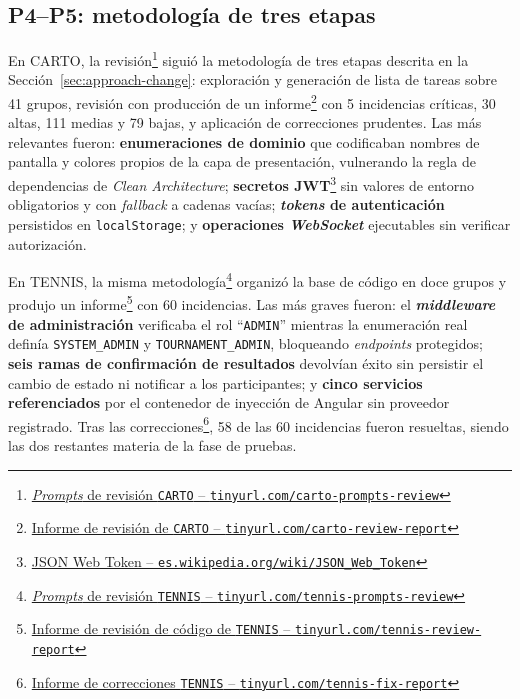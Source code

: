 \subsection{P4--P5: metodología de tres etapas}

En \ac{CARTO}, la revisión\footnote{\href{https://github.com/alu0101549491/TFG-Fabian-Gonzalez-Lence/tree/main/resources/prompts/4-CartographicProjectManager/4-RevisionDelCodigo}{\textit{Prompts} de revisión \texttt{CARTO} -- \texttt{tinyurl.com/carto-prompts-review}}} siguió la metodología de tres etapas descrita en la Sección~\ref{sec:approach-change}: exploración y generación de lista de tareas sobre 41 grupos, revisión con producción de un informe\footnote{\href{https://github.com/alu0101549491/TFG-Fabian-Gonzalez-Lence/blob/main/projects/4-CartographicProjectManager/docs/review/reports/CODE_REVIEW_REPORT.md}{Informe de revisión de \texttt{CARTO} -- \texttt{tinyurl.com/carto-review-report}}} con 5 incidencias críticas, 30 altas, 111 medias y 79 bajas, y aplicación de correcciones prudentes. Las más relevantes fueron: \textbf{enumeraciones de dominio} que codificaban nombres de pantalla y colores propios de la capa de presentación, vulnerando la regla de dependencias de \textit{Clean Architecture}; \textbf{secretos JWT}\footnote{\href{https://es.wikipedia.org/wiki/JSON_Web_Token}{JSON Web Token -- \texttt{es.wikipedia.org/wiki/JSON\_Web\_Token}}} sin valores de entorno obligatorios y con \textit{fallback} a cadenas vacías; \textbf{\textit{tokens} de autenticación} persistidos en \texttt{localStorage}; y \textbf{operaciones \textit{WebSocket}} ejecutables sin verificar autorización.

En \ac{TENNIS}, la misma metodología\footnote{\href{https://github.com/alu0101549491/TFG-Fabian-Gonzalez-Lence/tree/main/resources/prompts/5-TennisTournamentManager/4-RevisionDelCodigo}{\textit{Prompts} de revisión \texttt{TENNIS} -- \texttt{tinyurl.com/tennis-prompts-review}}} organizó la base de código en doce grupos y produjo un informe\footnote{\href{https://github.com/alu0101549491/TFG-Fabian-Gonzalez-Lence/blob/main/projects/5-TennisTournamentManager/docs/review_reports/TENNIS_review_report.md}{Informe de revisión de código de \texttt{TENNIS} -- \texttt{tinyurl.com/tennis-review-report}}} con 60 incidencias. Las más graves fueron: el \textbf{\textit{middleware} de administración} verificaba el rol  ``\texttt{ADMIN}''  mientras la enumeración real definía \texttt{SYSTEM\_ADMIN} y \texttt{TOURNAMENT\_ADMIN}, bloqueando \textit{endpoints} protegidos; \textbf{seis ramas de confirmación de resultados} devolvían éxito sin persistir el cambio de estado ni notificar a los participantes; y \textbf{cinco servicios referenciados} por el contenedor de inyección de Angular sin proveedor registrado. Tras las correcciones\footnote{\href{https://github.com/alu0101549491/TFG-Fabian-Gonzalez-Lence/blob/main/projects/5-TennisTournamentManager/docs/review_reports/TENNIS_fix_report.md}{Informe de correcciones \texttt{TENNIS} -- \texttt{tinyurl.com/tennis-fix-report}}}, 58 de las 60 incidencias fueron resueltas, siendo las dos restantes materia de la fase de pruebas.


